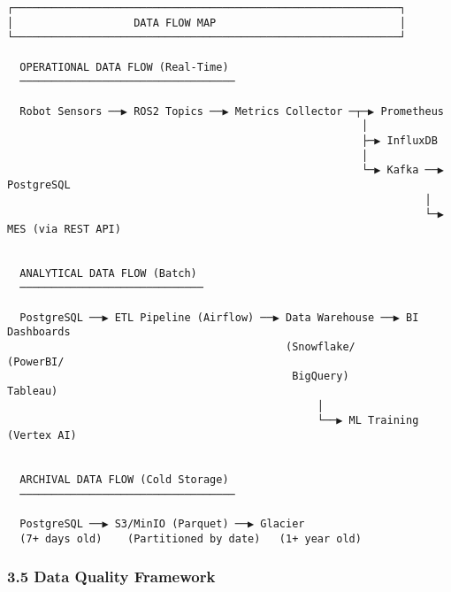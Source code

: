 \documentclass[
]{article}
\begin{document}
\begin{verbatim}
┌─────────────────────────────────────────────────────────────┐
│                   DATA FLOW MAP                             │
└─────────────────────────────────────────────────────────────┘

  OPERATIONAL DATA FLOW (Real-Time)
  ──────────────────────────────────

  Robot Sensors ──▶ ROS2 Topics ──▶ Metrics Collector ─┬─▶ Prometheus
                                                        │
                                                        ├─▶ InfluxDB
                                                        │
                                                        └─▶ Kafka ──▶ PostgreSQL
                                                                  │
                                                                  └─▶ MES (via REST API)


  ANALYTICAL DATA FLOW (Batch)
  ─────────────────────────────

  PostgreSQL ──▶ ETL Pipeline (Airflow) ──▶ Data Warehouse ──▶ BI Dashboards
                                            (Snowflake/         (PowerBI/
                                             BigQuery)          Tableau)
                                                 │
                                                 └──▶ ML Training (Vertex AI)


  ARCHIVAL DATA FLOW (Cold Storage)
  ──────────────────────────────────

  PostgreSQL ──▶ S3/MinIO (Parquet) ──▶ Glacier
  (7+ days old)    (Partitioned by date)   (1+ year old)
\end{verbatim}

\hypertarget{data-quality-framework}{%
\subsubsection{3.5 Data Quality
Framework}\label{data-quality-framework}}
\end{document}
